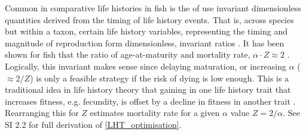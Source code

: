 \documentclass[a4paper]{article} %
\begin{document}
Common in comparative life histories in fish is the of use invariant dimensionless quantities derived from the timing of life history events. That is, across species but within a taxon, certain life history variables, representing the timing and magnitude of reproduction form dimensionless, invariant ratios \autocite{Charnov1990-invariant, Charnov1993, Prince2015}. It has been shown for fish that the ratio of age-at-maturity and mortality rate, $\alpha\cdot Z \approx 2$ \autocite{Charnov1993}. Logically, this invariant makes sense since delaying maturation, or increasing $\alpha$ ($\approx 2/Z$) is only a feasible strategy if the risk of dying is low enough. This is a traditional idea in life history theory that gaining in one life history trait that increases fitness, e.g. fecundity, is offset by a decline in fitness in another trait \autocite{Charlesworth1980, stearns1992evolution, Roff2006}. Rearranging this for $Z$ estimates mortality rate for a given $\alpha$ value $Z = 2/\alpha$.
See SI 2.2 for full derivation of \cref{LHT_optimisation}.
\end{document}
